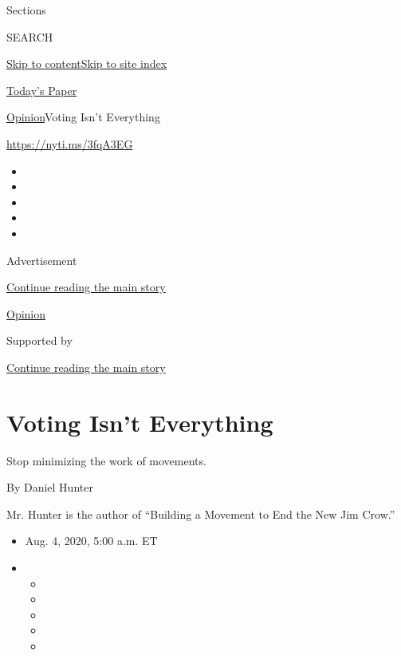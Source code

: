 Sections

SEARCH

\protect\hyperlink{site-content}{Skip to
content}\protect\hyperlink{site-index}{Skip to site index}

\href{https://myaccount.nytimes.com/auth/login?response_type=cookie\&client_id=vi}{}

\href{https://www.nytimes.com/section/todayspaper}{Today's Paper}

\href{/section/opinion}{Opinion}\textbar{}Voting Isn't Everything

\url{https://nyti.ms/3fqA3EG}

\begin{itemize}
\item
\item
\item
\item
\item
\end{itemize}

Advertisement

\protect\hyperlink{after-top}{Continue reading the main story}

\href{/section/opinion}{Opinion}

Supported by

\protect\hyperlink{after-sponsor}{Continue reading the main story}

\hypertarget{voting-isnt-everything}{%
\section{Voting Isn't Everything}\label{voting-isnt-everything}}

Stop minimizing the work of movements.

By Daniel Hunter

Mr. Hunter is the author of ``Building a Movement to End the New Jim
Crow.''

\begin{itemize}
\item
  Aug. 4, 2020, 5:00 a.m. ET
\item
  \begin{itemize}
  \item
  \item
  \item
  \item
  \item
  \end{itemize}
\end{itemize}


